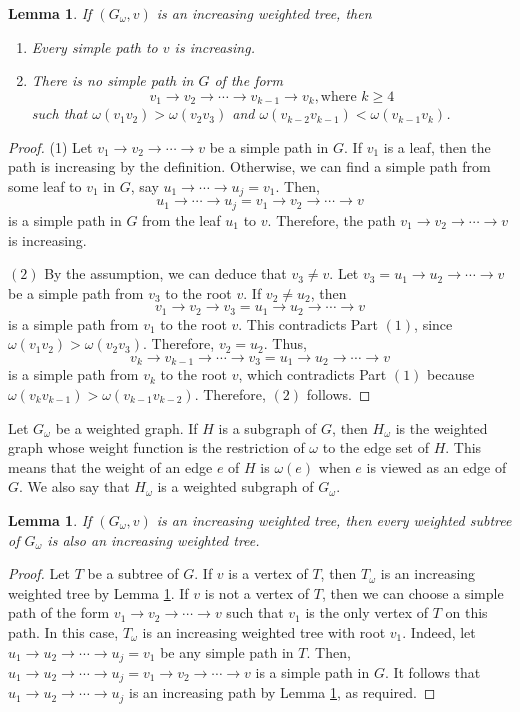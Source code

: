 \documentclass[12pt,amscd]{amsart}
\newtheorem{lem}[thm]{Lemma}
\theoremstyle{definition}
\begin{document}
\begin{lem}\label{inc} If $(G_\omega,v)$ is an increasing weighted tree, then
\begin{enumerate}
    \item Every simple path to $v$ is increasing.
    \item There is no simple path in $G$ of the form
    $$v_1\to v_2\to\cdots \to v_{k-1}\to v_k, \text{where } k \geqslant 4$$
    such that $\omega(v_1v_2) > \omega(v_2v_3)$ and $\omega(v_{k-2}v_{k-1}) < \omega(v_{k-1}v_k)$.
\end{enumerate}
\end{lem}
\begin{proof} (1) Let $v_1\to v_2\to\cdots \to v$ be a simple path in $G$. If $v_1$ is a leaf, then the path is increasing by the definition. Otherwise, we can find a simple path from some leaf to $v_1$ in $G$, say $u_1\to\cdots\to u_j=v_1$. Then,
$$u_1\to\cdots\to u_j = v_1\to v_2\to\cdots\to v$$
is a simple path in $G$ from the leaf $u_1$ to $v$. Therefore, the path $v_1\to v_2\to\cdots\to v$ is increasing.

$(2)$ By the assumption, we can deduce that $v_3 \ne v$. Let $v_3=u_1\to u_2\to\cdots \to v$ be a simple path from $v_3$ to the root $v$. If $v_2\ne u_2$, then
$$v_1\to v_2\to v_3=u_1\to u_2\to \cdots \to v$$
is a simple path from $v_1$ to the root $v$.  This contradicts  Part $(1)$, since $\omega(v_1v_2) > \omega(v_2v_3)$. Therefore,  $v_2=u_2$. Thus,
$$v_k\to v_{k-1}\to \cdots \to v_3=u_1\to u_2\to \cdots \to v$$
is a simple path from $v_k$ to the root $v$, which contradicts Part $(1)$  because  $\omega(v_kv_{k-1}) > \omega(v_{k-1}v_{k-2})$. Therefore, $(2)$ follows.
\end{proof}

Let $G_\omega$ be a weighted graph. If $H$ is a subgraph of $G$, then $H_\omega$ is the weighted graph whose weight function is the restriction of  $\omega$ to the edge set of $H$. This means that the weight of an edge $e$ of $H$ is  $\omega(e)$ when $e$ is viewed as  an edge of $G$. We also say that $H_\omega$ is a weighted subgraph of $G_\omega$.

\begin{lem}\label{sub-tree} If $(G_\omega,v)$ is an increasing weighted tree, then every weighted subtree of $G_\omega$ is also an increasing weighted tree.
\end{lem}
\begin{proof} Let $T$ be a subtree of $G$. If $v$ is a vertex of $T$, then $T_\omega$ is an increasing weighted tree by Lemma \ref{inc}. If $v$ is not a vertex of $T$, then we can choose a simple path of the form $v_1\to v_2\to \cdots\to v$ such that $v_1$ is the only vertex of $T$  on this path.  In this case,  $T_\omega$ is an increasing weighted tree with  root $v_1$. Indeed, let $u_1\to u_2\to \cdots \to u_j=v_1$ be any simple path in $T$. Then, $u_1\to u_2\to \cdots \to u_j=v_1\to v_2\to \cdots\to v$ is a simple path in $G$. It follows that $u_1\to u_2\to \cdots \to u_j$ is an increasing path by Lemma \ref{inc}, as required.
\end{proof}
\end{document}
